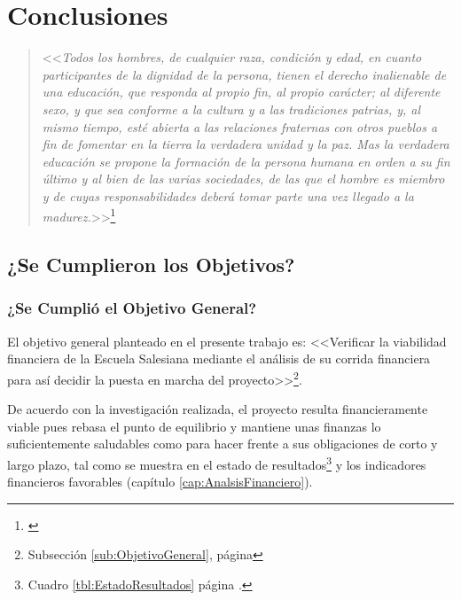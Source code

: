 \chapter*{Conclusiones}
\label{ch:Conclusiones}

\begin{quote}
<<\textit{Todos los hombres, de cualquier raza, condición y edad, en cuanto participantes de la dignidad de la persona, tienen el derecho inalienable de una educación, que responda al propio fin, al propio carácter; al diferente sexo, y que sea conforme a la cultura y a las tradiciones patrias, y, al mismo tiempo, esté abierta a las relaciones fraternas con otros pueblos a fin de fomentar en la tierra la verdadera unidad y la paz. Mas la verdadera educación se propone la formación de la persona humana en orden a su fin último y al bien de las varias sociedades, de las que el hombre es miembro y de cuyas responsabilidades deberá tomar parte una vez llegado a la madurez.}>>\footnote{\citep{GRED1965}}
\end{quote}

\section*{¿Se Cumplieron los Objetivos?}

\subsection*{¿Se Cumplió el Objetivo General?}


El objetivo general planteado en el presente trabajo es: <<Verificar la viabilidad financiera de la Escuela Salesiana mediante el análisis de su corrida financiera para así decidir la puesta en marcha del proyecto>>\footnote{Subsección \ref{sub:ObjetivoGeneral}, página \pageref{sub:ObjetivoGeneral}}.

De acuerdo con la investigación realizada, el proyecto resulta financieramente viable pues rebasa el punto de equilibrio y mantiene unas finanzas lo suficientemente saludables como para hacer frente a sus obligaciones de corto y largo plazo, tal como se muestra en el estado de resultados\footnote{Cuadro \ref{tbl:EstadoResultados} página \pageref{tbl:EstadoResultados}.} y los indicadores financieros favorables (capítulo \ref{cap:AnalsisFinanciero}).

